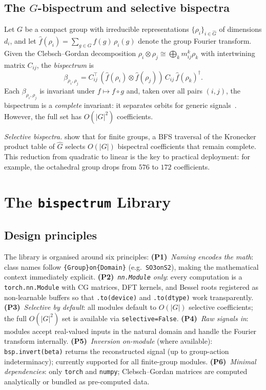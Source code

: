 \documentclass{article}
\begin{document}
\subsection{The $G$-bispectrum and selective bispectra}

Let $G$ be a compact group with irreducible representations
$\{\rho_i\}_{i \in \hat{G}}$ of dimensions $d_i$, and let
$\hat{f}(\rho_i) = \sum_{g \in G} f(g)\, \rho_i(g)$ denote the group
Fourier transform. Given the Clebsch--Gordan decomposition
$\rho_i \otimes \rho_j \cong \bigoplus_k m_{ij}^k \rho_k$ with
intertwining matrix $C_{ij}$, the \emph{bispectrum} is
\begin{equation}
  \label{eq:bispectrum-def}
  \beta_{\rho_i, \rho_j}
    = C_{ij}^\top\,
      (\hat{f}(\rho_i) \otimes \hat{f}(\rho_j))\,
      C_{ij}\, \hat{f}(\rho_k)^\dagger.
\end{equation}
Each $\beta_{\rho_i,\rho_j}$ is invariant under $f \mapsto f \circ g$ and,
taken over all pairs $(i,j)$, the bispectrum is a \emph{complete} invariant:
it separates orbits for generic signals~\citep{kakarala1992triple}. However,
the full set has $O(|G|^2)$ coefficients.

\emph{Selective bispectra.} \citet{mataigne2024selective} show that for
finite groups, a BFS traversal of the Kronecker product table of $\hat{G}$
selects $O(|G|)$ bispectral coefficients that remain complete. This
reduction from quadratic to linear is the key to practical deployment:
for example, the octahedral group drops from $576$ to $172$ coefficients.

\section{The \texttt{bispectrum} Library}
\label{sec:library}

\subsection{Design principles}
\label{sec:design}

The library is organised around six principles:
\textbf{(P1)}~\emph{Naming encodes the math}: class names follow
\texttt{\{Group\}on\{Domain\}} (e.g.\ \texttt{SO3onS2}), making the
mathematical context immediately explicit.
\textbf{(P2)}~\emph{\texttt{nn.Module} only}: every computation is a
\texttt{torch.nn.Module} with CG matrices, DFT kernels, and Bessel roots
registered as non-learnable buffers so that \texttt{.to(device)} and
\texttt{.to(dtype)} work transparently.
\textbf{(P3)}~\emph{Selective by default}: all modules default to
$O(|G|)$ selective coefficients; the full $O(|G|^2)$ set is available via
\texttt{selective=False}.
\textbf{(P4)}~\emph{Raw signals in}: modules accept real-valued inputs in
the natural domain and handle the Fourier transform internally.
\textbf{(P5)}~\emph{Inversion on-module} (where available):
\texttt{bsp.invert(beta)} returns the reconstructed signal (up to
group-action indeterminacy); currently supported for all finite-group
modules.
\textbf{(P6)}~\emph{Minimal dependencies}: only \texttt{torch} and
\texttt{numpy}; Clebsch--Gordan matrices are computed analytically or
bundled as pre-computed data.
\end{document}
